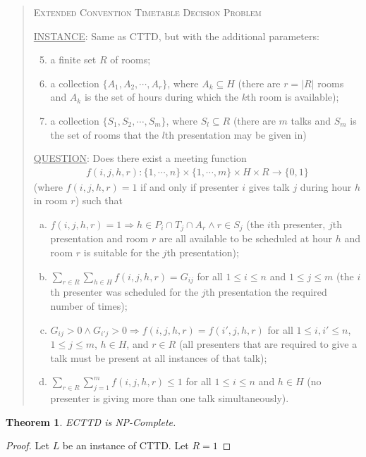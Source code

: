 \documentclass[]{article}
\newtheorem{thm}{Theorem}[section]
\theoremstyle{definition}
\theoremstyle{remark}
\numberwithin{equation}{section}
\begin{document}
\begin{quote}
	\textsc{Extended Convention Timetable Decision Problem}
	
	\underline{INSTANCE}: Same as CTTD, but with the additional parameters:
		\begin{enumerate}[1.]
			\setcounter{enumi}{4}
			\item a finite set $R$ of rooms;
			\item a collection $\{A_1,A_2,\cdots,A_r\}$, where $A_k \subseteq H$ (there are $r=|R|$ rooms and $A_k$ is the set of hours during which the $k$th room is available);
			\item a collection $\{S_1,S_2,\cdots,S_m\}$, where $S_l \subseteq R$ (there are $m$ talks and $S_m$ is the set of rooms that the $l$th presentation may be given in)
		\end{enumerate}
	\underline{QUESTION}: Does there exist a meeting function 
		\begin{gather*}
			f(i,j,h,r) : \{1,\cdots,n\} \times \{1,\cdots,m\} \times H \times R \rightarrow \{0,1\}
		\end{gather*}
		(where $f(i,j,h,r)=1$ if and only if presenter $i$ gives talk $j$ during hour $h$ in room $r$) such that
		\begin{enumerate}[(a)]
			\item $f(i,j,h,r) = 1 \Rightarrow h \in P_i \cap T_j \cap A_r \land r \in S_j$ (the $i$th presenter, $j$th presentation and room $r$ are all available to be scheduled at hour $h$ and room $r$ is suitable for the $j$th presentation);
			\item $\sum\limits_{r \in R}\sum\limits_{h \in H} f(i,j,h,r) = G_{ij}$ for all $1 \le i \le n$ and $1 \le j \le m$ (the $i$th presenter was scheduled for the $j$th presentation the required number of times);
			\item $G_{ij} > 0 \land G_{i'j} > 0 \Rightarrow f(i,j,h,r)=f(i',j,h,r)$ for all $1 \le i,i' \le n$, $1 \le j \le m$, $h \in H$, and $r \in R$ (all presenters that are required to give a talk must be present at all instances of that talk);
			\item $\sum\limits_{r \in R}\sum\limits_{j=1}^m f(i,j,h,r) \le 1$ for all $1 \le i \le n$ and $h \in H$ (no presenter is giving more than one talk simultaneously).
		\end{enumerate}
\end{quote}
\begin{thm}
ECTTD is NP-Complete.
\end{thm}
\begin{proof}
Let $L$ be an instance of CTTD. Let $R={1}$
\end{proof}
\end{document}
